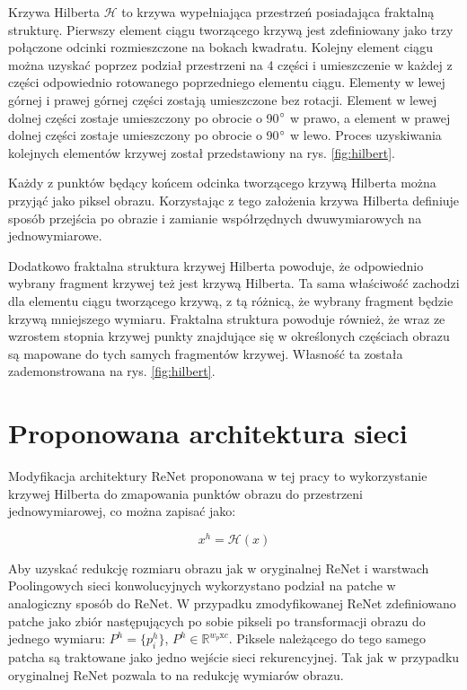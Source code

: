 \documentclass[oneside, mag]{mgr}
\begin{document}
Krzywa Hilberta $\mathcal{H}$ to krzywa wypełniająca przestrzeń posiadająca fraktalną strukturę. Pierwszy element ciągu tworzącego krzywą jest zdefiniowany jako trzy połączone odcinki rozmieszczone na bokach kwadratu. Kolejny element ciągu można uzyskać poprzez podział przestrzeni na 4 części i umieszczenie w każdej z części odpowiednio rotowanego poprzedniego elementu ciągu. Elementy w lewej górnej i prawej górnej części zostają umieszczone bez rotacji. Element w lewej dolnej części zostaje umieszczony po obrocie o 90$\degree$ w prawo, a element w prawej dolnej części zostaje umieszczony po obrocie o 90$\degree$ w lewo. Proces uzyskiwania kolejnych elementów krzywej został przedstawiony na rys. \ref{fig:hilbert}.

Każdy z punktów będący końcem odcinka tworzącego krzywą Hilberta można przyjąć jako piksel obrazu. Korzystając z tego założenia krzywa Hilberta definiuje sposób przejścia po obrazie i zamianie współrzędnych dwuwymiarowych na jednowymiarowe.

Dodatkowo fraktalna struktura krzywej Hilberta powoduje, że odpowiednio wybrany fragment krzywej też jest krzywą Hilberta. Ta sama właściwość zachodzi dla elementu ciągu tworzącego krzywą, z tą różnicą, że wybrany fragment będzie krzywą mniejszego wymiaru. Fraktalna struktura powoduje również, że wraz ze wzrostem stopnia krzywej punkty znajdujące się w określonych częściach obrazu są mapowane do tych samych fragmentów krzywej. Własność ta została zademonstrowana na rys. \ref{fig:hilbert}.

\section{Proponowana architektura sieci}

Modyfikacja architektury ReNet proponowana w tej pracy to wykorzystanie krzywej Hilberta do zmapowania punktów obrazu do przestrzeni jednowymiarowej, co można zapisać jako:

\begin{equation}
	x^{h} = \mathcal{H}(x)
\end{equation}

Aby uzyskać redukcję rozmiaru obrazu jak w oryginalnej ReNet i warstwach Poolingowych sieci konwolucyjnych wykorzystano podział na patche w analogiczny sposób do ReNet. W przypadku zmodyfikowanej ReNet zdefiniowano patche jako zbiór następujących po sobie pikseli po transformacji obrazu do jednego wymiaru: $P^{h} = \{ p_{i}^h \}$, $P^{h} \in \mathbb{R}^{w_p \textrm{x} c}$. Piksele należącego do tego samego patcha są traktowane jako jedno wejście sieci rekurencyjnej. Tak jak w przypadku oryginalnej ReNet pozwala to na redukcję wymiarów obrazu.
\end{document}
